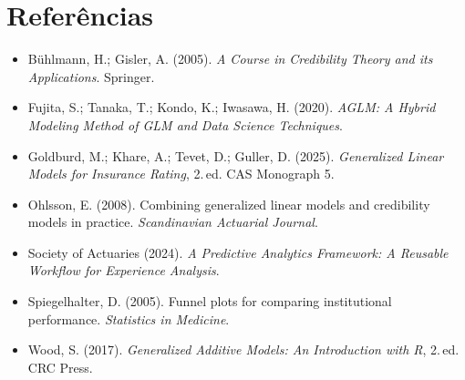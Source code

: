 \documentclass[11pt,a4paper]{article}
\begin{document}
\section*{Referências}
\begin{itemize}[leftmargin=*]
\item Bühlmann, H.; Gisler, A. (2005). \emph{A Course in Credibility Theory and its Applications}. Springer.
\item Fujita, S.; Tanaka, T.; Kondo, K.; Iwasawa, H. (2020). \emph{AGLM: A Hybrid Modeling Method of GLM and Data
  Science Techniques}.
\item Goldburd, M.; Khare, A.; Tevet, D.; Guller, D. (2025). \emph{Generalized Linear Models for Insurance Rating},
  2.\,ed. CAS Monograph 5.
\item Ohlsson, E. (2008). Combining generalized linear models and credibility models in practice.
  \emph{Scandinavian Actuarial Journal}.
\item Society of Actuaries (2024). \emph{A Predictive Analytics Framework: A Reusable Workflow for Experience Analysis}.
\item Spiegelhalter, D. (2005). Funnel plots for comparing institutional performance. \emph{Statistics in Medicine}.
\item Wood, S. (2017). \emph{Generalized Additive Models: An Introduction with R}, 2.\,ed. CRC Press.
\end{itemize}
\end{document}

